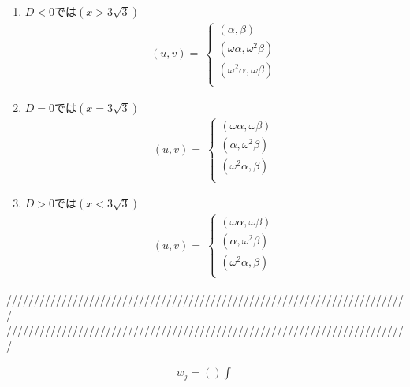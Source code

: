 \documentclass[dvipdfmx]{report} %
\begin{document}
\begin{enumerate}[(1)\,]
\item{$D < 0 $では$(x > 3 \sqrt{3})$}
\begin{equation*}
\begin{split}
	( u, v ) =\
		\begin{cases}
			( \alpha, \beta )\\
			( \omega\alpha, \omega^2 \beta )\\
			( \omega^2 \alpha, \omega\beta )\\
		\end{cases}
\end{split}
\end{equation*}

\item{$D = 0 $では$(x = 3 \sqrt{3})$}
\begin{equation*}
\begin{split}
	( u, v ) =\
		\begin{cases}
			( \omega\alpha, \omega\beta )\\
			( \alpha, \omega^2 \beta )\\
			( \omega^2 \alpha, \beta )\\
		\end{cases}
\end{split}
\end{equation*}

\item{$D > 0 $では$(x < 3 \sqrt{3})$}
\begin{equation*}
\begin{split}
	( u, v ) =\
		\begin{cases}
			( \omega\alpha, \omega\beta )\\
			( \alpha, \omega^2 \beta )\\
			( \omega^2 \alpha, \beta )\\
		\end{cases}
\end{split}
\end{equation*}
\end{enumerate}

\noindent
/////////////////////////////////////////////////////////////////////////\\
/////////////////////////////////////////////////////////////////////////

\begin{equation*}
\begin{split}
	\bar{w}_j = \left( \right) \int^{}_{}
\end{split}
\end{equation*}
\end{document}
